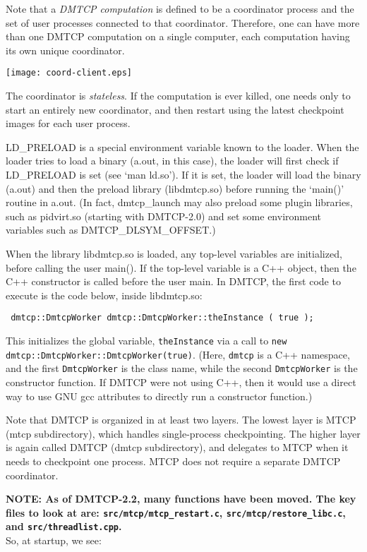 \documentclass{article}
\begin{document}
Note that a {\em DMTCP computation} is defined to be a coordinator process
and the set of user processes connected to that coordinator.  Therefore,
one can have more than one DMTCP computation on a single computer,
each computation having its own unique coordinator.

\begin{center}
\texttt{[image: coord-client.eps]}
\end{center}

The coordinator is {\em stateless}.  If the computation is ever killed,
one needs only to start an entirely new coordinator, and then restart
using the latest checkpoint images for each user process.

LD\_PRELOAD is a special environment variable known to the loader.
When the loader tries to load a binary (a.out, in this case), the loader
will first check if LD\_PRELOAD is set (see `man ld.so').  If it is
set, the loader will load the binary (a.out) and then the preload library
(libdmtcp.so) before running the `main()' routine in a.out.
(In fact, dmtcp\_launch may also preload some plugin libraries,
 such as pidvirt.so (starting with DMTCP-2.0) and set some
 environment variables such as DMTCP\_DLSYM\_OFFSET.)

When the library libdmtcp.so is loaded, any top-level variables
are initialized, before calling the user main().  If the top-level variable
is a C++ object, then the C++ constructor is called before the
user main.  In DMTCP, the first code to execute is the code
below, inside libdmtcp.so:

{\tt
dmtcp::DmtcpWorker dmtcp::DmtcpWorker::theInstance ( true );
}

This initializes the global variable, {\tt theInstance} via a call
to {\tt new dmtcp::DmtcpWorker::DmtcpWorker(true)}.  (Here, {\tt dmtcp}
is a C++ namespace, and the first {\tt DmtcpWorker} is the class name,
while the second {\tt DmtcpWorker} is the constructor function.  If DMTCP were
not using C++, then it would use a direct way to use GNU gcc attributes
to directly run a constructor function.)

Note that DMTCP is organized in at least two layers.  The lowest layer
is MTCP (mtcp subdirectory), which handles single-process checkpointing.
The higher layer is again called DMTCP (dmtcp subdirectory), and delegates
to MTCP when it needs to checkpoint one process.  MTCP does not require
a separate DMTCP coordinator.

{\bf  NOTE: As of DMTCP-2.2, many functions have been moved.  The key
files to look at are:  {\tt src/mtcp/mtcp\_restart.c},
{\tt src/mtcp/restore\_libc.c}, and {\tt src/threadlist.cpp}.} \\
So, at startup, we see:
\end{document}
